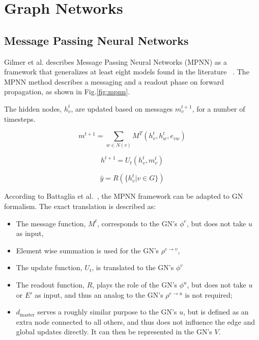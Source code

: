 \section{Graph Networks}

\subsection{Message Passing Neural Networks}

Gilmer et al. describes Message Passing Neural Networks (MPNN) as a framework that generalizes at least eight models found in the literature ~\cite{Gilmer_2017}. The MPNN method describes a messaging and a readout phase on forward propagation, as shown in Fig.\ref{fig:mpnn}.
	
The hidden nodes, $h_v^t$, are updated based on messages $m_v^{t+1}$, for a number of timesteps.

\begin{equation}
    \label{eqn:message}
    m^{t+1} = \sum_{w \in N(v)} M ^ {T} (h^t_v, h^t_w, e_{vw})
\end{equation}

\begin{equation}
    h^{t+1} = U_t(h^t_v, m^t_v)
\end{equation}

\begin{equation}
    \hat{y} = R (\{h^t_v | v \in G\})
\end{equation}

According to Battaglia et al.~\cite{Battaglia_2018}, the MPNN framework can be adapted to GN formalism. The exact translation is described as:

\begin{itemize}

    \item The message function, $M^{t}$, corresponds to the GN’s $\phi ^ e$, but does not take $u$ as input,
    
    \item Element wise summation is used for the GN’s $\rho ^ {e \rightarrow v}$,
    
    \item The update function, $U_t$, is translated to the GN’s $\phi ^ v$
    
    \item The readout function, $R$, plays the role of the GN’s $\phi ^ u$, but does not take $u$ or $E'$ as input, and thus an analog to the GN’s $\rho ^ {e \rightarrow u}$ is not required;
    
    \item $d_{\text{master}}$ serves a roughly similar purpose to the GN’s $u$, but is defined as an extra node connected to all others, and thus does not influence the edge and global updates directly. It can then be represented in the GN’s $V$.

\end{itemize}

